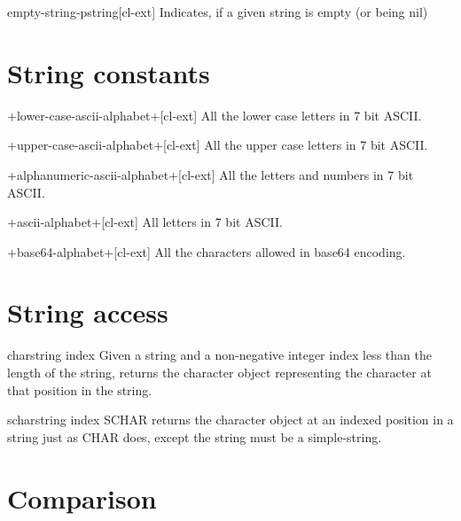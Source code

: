 \documentclass[10pt,english]{book}
\begin{document}
\begin{function}{empty-string-p}{string}[cl-ext]
  Indicates, if a given string is empty (or being nil)
\end{function}

\section{String constants}
\label{sec:string-constants}

\begin{constant}{+lower-case-ascii-alphabet+}{}[cl-ext]
  All the lower case letters in 7 bit ASCII.
\end{constant}

\begin{constant}{+upper-case-ascii-alphabet+}{}[cl-ext]
  All the upper case letters in 7 bit ASCII.
\end{constant}

\begin{constant}{+alphanumeric-ascii-alphabet+}{}[cl-ext]
  All the letters and numbers in 7 bit ASCII.
\end{constant}

\begin{constant}{+ascii-alphabet+}{}[cl-ext]
  All letters in 7 bit ASCII.
\end{constant}

\begin{constant}{+base64-alphabet+}{}[cl-ext]
  All the characters allowed in base64 encoding.
\end{constant}

\section{String access}
\label{sec:string-access}

\begin{accessor}{char}{string index}
  Given a string and a non-negative integer index less than the length of
  the string, returns the character object representing the character at
  that position in the string.
\end{accessor}

\begin{accessor}{schar}{string index}
  SCHAR returns the character object at an indexed position in a string
   just as CHAR does, except the string must be a simple-string.
\end{accessor}

\section{Comparison}
\label{sec:string-comparison}
\end{document}
